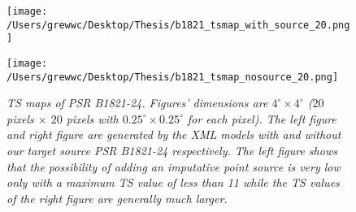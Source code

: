 \documentclass[12pt]{report}
\newcommand{\mycaption}[1]{\caption{\textit{\footnotesize #1}}}
\begin{document}
            \begin{figure}[!ht]
              \begin{center}
              \begin{minipage}{0.46\textwidth}
                \begin{center} 
                  \texttt{[image: /Users/grewwc/Desktop/Thesis/b1821\_tsmap\_with\_source\_20.png]}
                \end{center}
              \end{minipage}
              \begin{minipage}{0.45\textwidth}
                \begin{center}
                  \texttt{[image: /Users/grewwc/Desktop/Thesis/b1821\_tsmap\_nosource\_20.png]}
                \end{center}
              \end{minipage}
            \end{center}
            \mycaption{TS maps of PSR B1821-24. Figures' dimensions are $4^{\circ} \times4^{\circ}$ 
            ($20$ pixels $\times$ $20$ pixels with $0.25^{\circ} \times 0.25^{\circ}$ for each pixel). 
            The \textsf{left} figure and \textsf{right} figure are generated by the XML models with and without our 
            target source PSR B1821-24 respectively. The \textsf{left} figure shows that the possibility 
            of adding an imputative point source is very low only with a maximum TS value of 
            less than 11 while the TS values of the \textsf{right} figure are generally much larger.}
            \label{fig: b1821_tsmap_comparison_20}
            \end{figure}
            \vspace{1cm}
\end{document}
